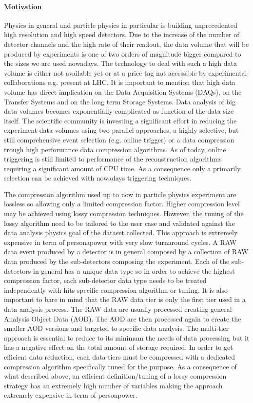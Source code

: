 \paragraph{Motivation}

Physics in general and particle physics in particular is building unprecedented high resolution and high speed detectors. Due to the increase of the number of detector channels and the high rate of their readout, the data volume that will be produced by experiments is one of two orders of magnitude bigger compared to the sizes we are used nowadays. The technology to deal with such a high data volume is either not available yet or at a price tag not accessible by experimental collaborations e.g. present at LHC. It is important to mention that high data volume has direct implication on the Data Acquisition Systems (DAQs), on the Transfer Systems and on the long term Storage Systems. Data analysis of big data volumes becomes exponentially complicated as function of the data size itself. The scientific community is investing a significant effort in reducing the experiment data volumes using two parallel approaches, a highly selective, but still comprehensive event selection (e.g. online trigger) or a data compression trough high performance data compression algorithms. 
As of today, online triggering is still limited to performance of the reconstruction algorithms requiring a significant amount of CPU time. As a consequence only a primarily selection can be achieved with nowadays triggering techniques. 

The compression algorithm used up to now in particle physics experiment are lossless so allowing only a limited compression factor. Higher compression level may be achieved using lossy compression techniques. However, the tuning of the lossy algorithm need to be tailored to the user case and validated against the data analysis physics goal of the dataset collected. This approach is extremely expensive in term of personapower with very slow turnaround cycles. A RAW data event produced by a detector is in general composed by a collection of RAW data produced by the sub-detectors composing the experiment. Each of the sub-detectors in general has a unique data type so in order to achieve the highest compression factor, each sub-detector data type needs to be treated independently with hits specific compression algorithm or tuning. It is also important to bare in mind that the RAW data tier is only the first tier used in a data analysis process. The RAW data are usually processed creating general Analysis Object Data (AOD). The AOD are then processed again to create the smaller AOD versions and targeted to specific data analysis. The multi-tier approach is essential to reduce to its minimum the needs of data processing but it has a negative effect on the total amount of storage required. In order to get efficient data reduction, each data-tiers must be compressed with a dedicated compression algorithm specifically tuned for the purpose.  As a consequence of what described above, an efficient definition/tuning of a lossy compression strategy has an extremely high number of variables making the approach extremely expensive in term of personpower.

